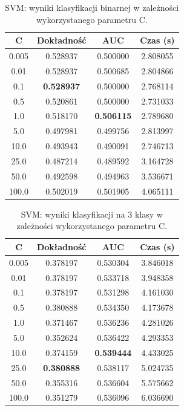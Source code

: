 \documentclass[a4paper, twoside, 11pt, openright]{article}
\begin{document}
\begin{table}[H]
    \centering
    \begin{tabular}{|c|c|c|c|}
    \hline
        \textbf{C} & \textbf{Dokładność} & \textbf{AUC} & \textbf{Czas (s)} \\ \hline
0.005 &  0.528937 &  0.500000 &    2.808055 \\ \hline
0.01  &  0.528937 &  0.500685 &    2.804866 \\ \hline
0.1   &  \textbf{0.528937} &  0.500000 &    2.768114 \\ \hline
0.5   &  0.520861 &  0.500000 &    2.731033 \\ \hline
1.0   &  0.518170 &  \textbf{0.506115} &    2.789680 \\ \hline
5.0   &  0.497981 &  0.499756 &    2.813997 \\ \hline
10.0  &  0.493943 &  0.490091 &    2.746713 \\ \hline
25.0  &  0.487214 &  0.489592 &    3.164728 \\ \hline
50.0  &  0.492598 &  0.494963 &    3.536671 \\ \hline
100.0 &  0.502019 &  0.501905 &    4.065111 \\ \hline

    \end{tabular}
    \caption{SVM: wyniki klasyfikacji binarnej w zależności wykorzystanego parametru C.}
    \label{tab:svm_c_binary}
\end{table}


\begin{table}[H]
    \centering
    \begin{tabular}{|c|c|c|c|}
    \hline
        \textbf{C} & \textbf{Dokładność} & \textbf{AUC} & \textbf{Czas (s)} \\ \hline
0.005 &  0.378197 &  0.530304 &    3.846018 \\ \hline
0.01  &  0.378197 &  0.533718 &    3.948358 \\ \hline
0.1   &  0.378197 &  0.531298 &    4.161030 \\ \hline
0.5   &  0.380888 &  0.534350 &    4.173678 \\ \hline
1.0   &  0.371467 &  0.536236 &    4.281026 \\ \hline
5.0   &  0.352624 &  0.536422 &    4.293353 \\ \hline
10.0  &  0.374159 &  \textbf{0.539444} &    4.433025 \\ \hline
25.0  &  \textbf{0.380888} &  0.538117 &    5.024735 \\ \hline
50.0  &  0.355316 &  0.536604 &    5.575662 \\ \hline
100.0 &  0.351279 &  0.536096 &    6.036690 \\ \hline
    \end{tabular}
    \caption{SVM: wyniki klasyfikacji na 3 klasy w zależności wykorzystanego parametru C.}
    \label{tab:svm_c_discrete}
\end{table}
\end{document}
